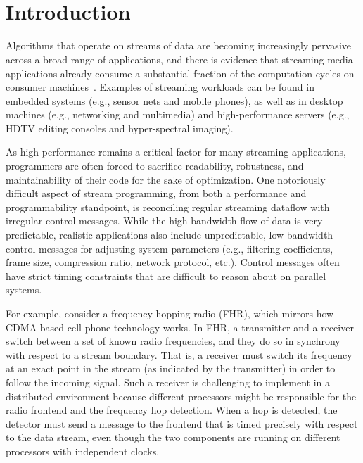 ~\\~\\
\section{Introduction}

\long{}

Algorithms that operate on streams of data are becoming increasingly
pervasive across a broad range of applications, and there is evidence
that streaming media applications already consume a substantial
fraction of the computation cycles on consumer
machines~\cite{conte97,dief97,kirkpatrick97,Rix98}.  Examples of
streaming workloads can be found in embedded systems (e.g., sensor
nets and mobile phones), as well as in desktop machines (e.g.,
networking and multimedia) and high-performance servers (e.g., HDTV
editing consoles and hyper-spectral imaging).

As high performance remains a critical factor for many streaming
applications, programmers are often forced to sacrifice readability,
robustness, and maintainability of their code for the sake of
optimization.  One notoriously difficult aspect of stream programming,
from both a performance and programmability standpoint, is reconciling
regular streaming dataflow with irregular control messages.  While the
high-bandwidth flow of data is very predictable, realistic
applications also include unpredictable, low-bandwidth control
messages for adjusting system parameters (e.g., filtering
coefficients, frame size, compression ratio, network protocol, etc.).
Control messages often have strict timing constraints that are
difficult to reason about on parallel systems.

For example, consider a frequency hopping radio (FHR), which mirrors
how CDMA-based cell phone technology works.  In FHR, a transmitter and
a receiver switch between a set of known radio frequencies, and they
do so in synchrony with respect to a stream boundary. That is, a
receiver must switch its frequency at an exact point in the stream (as
indicated by the transmitter) in order to follow the incoming signal.
Such a receiver is challenging to implement in a distributed
environment because different processors might be responsible for the
radio frontend and the frequency hop detection.  When a hop is
detected, the detector must send a message to the frontend that is
timed precisely with respect to the data stream, even though the two
components are running on different processors with independent
clocks.

